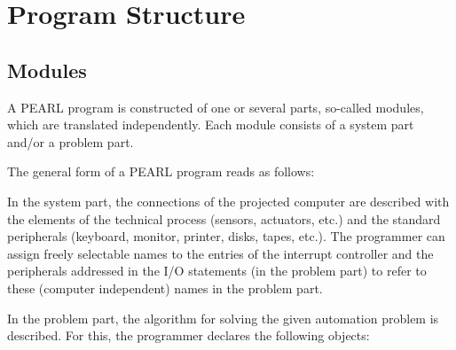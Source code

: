 \chapter{Program Structure}   %

\section{Modules}  %
\label{sec_modules}

A PEARL program is constructed of one or several parts, so-called
modules, which are translated independently. Each module consists of a
system part and/or a problem part.

The general form of a PEARL program reads as follows:












In the system part, the connections of the projected computer are
described with the elements of the technical process (sensors,
actuators, etc.) and the standard peripherals (keyboard, monitor,
printer, disks, tapes, etc.). The programmer can assign freely
selectable names to the entries of the interrupt controller and the
peripherals addressed in the I/O statements (in the problem part) to
refer to these (computer independent) names in the problem part.

In the problem part, the algorithm for solving the given automation
problem is described. For this, the programmer declares the following
objects:

